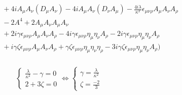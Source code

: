 \documentclass[10pt]{book}
\theoremstyle{break}
\begin{document}
\begin{eqnarray*}
 && \hspace{3cm} + 4i A_\mu A_\nu (D_\mu A_\nu) - 4i A_\mu A_\nu (D_\nu A_\mu) - \frac{4i\lambda}{\kappa^2} \epsilon_{\mu \nu \rho} A_\mu A_\nu A_\rho \nonumber \\
 && \hspace{3cm} - 2 A^4 + 2 A_\mu A_\nu A_\mu A_\nu \nonumber \\
 && \hspace{3cm} + 2i \gamma \epsilon_{\mu \nu \rho} A_\mu A_\nu A_\rho - 4 i \gamma \epsilon_{\mu \nu \rho} \eta_\mu \eta_\nu A_\rho - 2i \gamma \epsilon_{\mu \nu \rho} \eta_\mu \eta_\nu A_\rho \nonumber \\
 && \hspace{3cm} + i \gamma \zeta \epsilon_{\mu \nu \rho} A_\mu A_\nu A_\rho + \gamma \zeta \epsilon_{\mu \nu \rho} \eta_{\mu} \eta_\nu \eta_\rho - 3i \gamma\zeta \epsilon_{\mu \nu \rho} \eta_\mu \eta_\nu A_\rho \Bigg) \nonumber \\
\end{eqnarray*}


\begin{eqnarray*}
 \left\{ 
  \begin{array}{rcl}
   \frac{\lambda}{\kappa^2} - \gamma = 0 \\ 
   2 + 3 \zeta = 0
  \end{array}\right.
  \Longleftrightarrow 
 \left\{ 
  \begin{array}{rcl}
   \gamma = \frac{\lambda}{\kappa^2} \\ 
   \zeta = \frac{-2}{3}
  \end{array}
 \right.
\end{eqnarray*}
\end{document}
